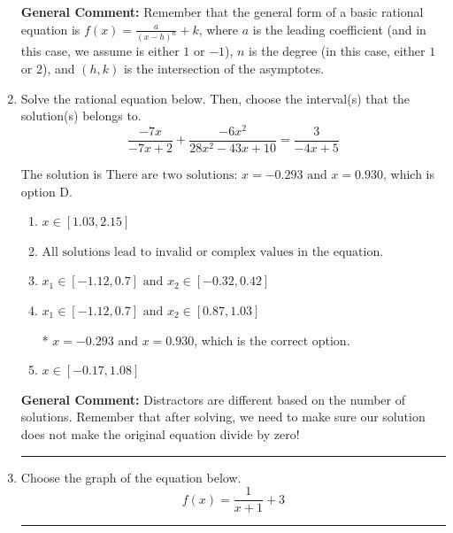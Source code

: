 \documentclass{extbook}[14pt]
\newcommand{\litem}[1]{\item #1

\rule{\textwidth}{0.4pt}}
\begin{document}
\begin{enumerate}
{\textbf{General Comment:} Remember that the general form of a basic rational equation is $ f(x) = \frac{a}{(x-h)^n} + k$, where $a$ is the leading coefficient (and in this case, we assume is either $1$ or $-1$), $n$ is the degree (in this case, either $1$ or $2$), and $(h, k)$ is the intersection of the asymptotes.
}
\litem{
Solve the rational equation below. Then, choose the interval(s) that the solution(s) belongs to.
\[ \frac{-7x}{-7x + 2} + \frac{-6x^{2}}{28x^{2} -43 x + 10} = \frac{3}{-4x + 5} \]

The solution is \( \text{There are two solutions: } x = -0.293 \text{ and } x = 0.930 \), which is option D.\begin{enumerate}[label=\Alph*.]
\item \( x \in [1.03,2.15] \)


\item \( \text{All solutions lead to invalid or complex values in the equation.} \)


\item \( x_1 \in [-1.12, 0.7] \text{ and } x_2 \in [-0.32,0.42] \)


\item \( x_1 \in [-1.12, 0.7] \text{ and } x_2 \in [0.87,1.03] \)

* $x = -0.293 \text{ and } x = 0.930$, which is the correct option.
\item \( x \in [-0.17,1.08] \)


\end{enumerate}

\textbf{General Comment:} Distractors are different based on the number of solutions. Remember that after solving, we need to make sure our solution does not make the original equation divide by zero!
}
\litem{
Choose the graph of the equation below.
\[ f(x) = \frac{1}{x + 1} + 3 \]

}
\end{enumerate}
\end{document}
